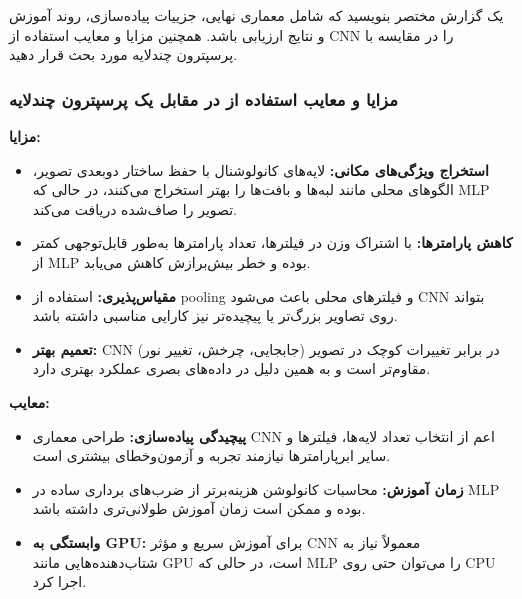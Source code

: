 		یک گزارش مختصر بنویسید که شامل معماری نهایی، جزییات پیاده‌سازی، روند آموزش و نتایج ارزیابی باشد. همچنین مزایا و معایب استفاده از CNN را در مقایسه با پرسپترون چندلایه مورد بحث قرار دهید.

		\subsubsection{مزایا و معایب استفاده از  در مقابل یک پرسپترون چندلایه}

		\vspace{0.5em}
		\noindent
		\textbf{مزایا:}
		\begin{itemize}
			\item \textbf{استخراج ویژگی‌های مکانی:} لایه‌های کانولوشنال با حفظ ساختار دوبعدی تصویر، الگوهای محلی مانند لبه‌ها و بافت‌ها را بهتر استخراج می‌کنند، در حالی که MLP تصویر را صاف‌شده دریافت می‌کند.
			\item \textbf{کاهش پارامترها:} با اشتراک وزن در فیلترها، تعداد پارامترها به‌طور قابل‌توجهی کمتر از MLP بوده و خطر بیش‌برازش کاهش می‌یابد.
			\item \textbf{مقیاس‌پذیری:} استفاده از pooling و فیلترهای محلی باعث می‌شود CNN بتواند روی تصاویر بزرگ‌تر یا پیچیده‌تر نیز کارایی مناسبی داشته باشد.
			\item \textbf{تعمیم بهتر:} CNN در برابر تغییرات کوچک در تصویر (جابجایی، چرخش، تغییر نور) مقاوم‌تر است و به همین دلیل در داده‌های بصری عملکرد بهتری دارد.
		\end{itemize}

		\noindent
		\textbf{معایب:}
		\begin{itemize}
			\item \textbf{پیچیدگی پیاده‌سازی:} طراحی معماری CNN اعم از انتخاب تعداد لایه‌ها، فیلترها و سایر ابرپارامترها نیازمند تجربه و آزمون‌وخطای بیشتری است.
			\item \textbf{زمان آموزش:} محاسبات کانولوشن هزینه‌برتر از ضرب‌های برداری ساده در MLP بوده و ممکن است زمان آموزش طولانی‌تری داشته باشد.
			\item \textbf{وابستگی به GPU:} برای آموزش سریع و مؤثر CNN معمولاً نیاز به شتاب‌دهنده‌هایی مانند GPU است، در حالی که MLP را می‌توان حتی روی CPU اجرا کرد.
		\end{itemize}

